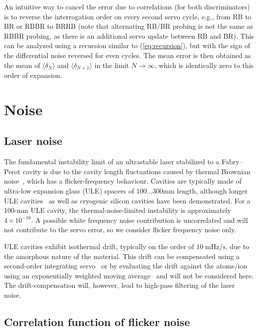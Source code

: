 \documentclass[10pt,a4paper]{iopart}
\newcommand{\eqref}[1]{(\ref{#1})}
\begin{document}
An intuitive way to cancel the error due to correlations (for both discriminators) is to reverse the interrogation order on every second servo cycle, e.g., from RB to BR or RBBR to BRRB (note that alternating RB/BR probing is not the same as RBBR probing, as there is an additional servo update between RB and BR).
This can be analyzed using a recursion similar to \eqref{eq:recursion}, but with the sign of the differential noise reversed for even cycles. The mean error is then obtained as the mean of $\langle \delta_N \rangle$ and $\langle \delta_{N+1} \rangle$ in the limit $N \rightarrow \infty$, which is identically zero to this order of expansion.


\section{Noise \label{sec:noise}}

\subsection{Laser noise} \label{sec:laser-noise}

The fundamental instability limit of an ultrastable laser stabilized to a Fabry--Perot cavity is due to the cavity length fluctuations caused by thermal Brownian noise~\cite{Numata2004a}, which has a flicker-frequency behaviour. Cavities are typically made of ultra-low expansion glass (ULE) spacers of $100\ldots 300$\;mm length, although longer ULE cavities~\cite{Hafner2015a} as well as cryogenic silicon cavities \cite{Kessler2012a} have been demonstrated. For a 100-mm ULE cavity, the thermal-noise-limited instability is approximately $4\times 10^{-16}$. A possible white frequency noise contribution is uncorrelated and will not contribute to the servo error, so we consider flicker frequency noise only.

ULE cavities exhibit isothermal drift, typically on the order of $10\;\mathrm{mHz/s}$, due to the amorphous nature of the material. This drift can be compensated using a second-order integrating servo~\cite{Peik2006a} or by evaluating the drift against the atoms/ion using an exponentially weighted moving average~\cite{Dube2017a} and will not be considered here. The drift-compensation will, however, lead to high-pass filtering of the laser noise.


\subsection{Correlation function of flicker noise} \label{sec:corrfunc}
\end{document}
